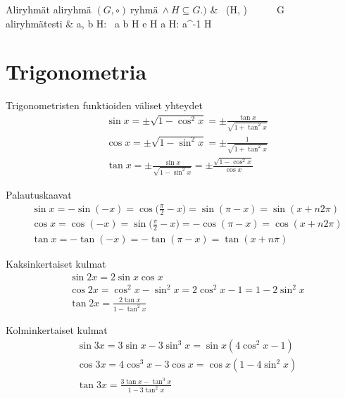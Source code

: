 \begin{eqtable-full}{Aliryhmät \cite{YHTTAY-60050}}
aliryhmä	 \newline $(G, \circ) \ \text{ryhmä} \ \land H \subseteq G.)$
				&  \ (H, \circ) \  \ \rightarrow \  \ G \  \\
aliryhmätesti	& \forall a, b \in H: \ a \circ b \in H \newline
					e \in H \newline
					\forall a \in H: a^{-1} \in H \\
\end{eqtable-full}

\clearpage

\section{Trigonometria}

Trigonometristen funktioiden väliset yhteydet \cite[s. 31]{MAOL}
\begin{align*}
& \sin x = \pm \sqrt{1- \cos^2 x} = \pm \frac{\tan x}{\sqrt{1 + \tan^2 x}} \\
& \cos x = \pm \sqrt{1 - \sin^2 x} = \pm \frac{1}{\sqrt{1 + \tan^2 x}} \\
& \tan x = \pm \frac{ \sin x}{\sqrt{1 - \sin^2 x}} = \pm \frac{\sqrt{1 - \cos^2 x}}{\cos x}
\end{align*}

Palautuskaavat \cite[s. 31]{MAOL}
\begin{align*}
& \sin x = - \sin(-x) = \cos \Big( \frac{\pi}{2} - x \Big) = \sin(\pi -x) = \sin(x + n2\pi) \\
& \cos x = \cos(-x) = \sin \Big( \frac{\pi}{2} - x \Big) = -\cos(\pi-x) = \cos(x + n2\pi) \\
& \tan x = - \tan(-x) = -\tan(\pi - x) = \tan(x + n\pi)
\end{align*}

Kaksinkertaiset kulmat \cite[s. 32]{MAOL}
\begin{align*}
& \sin 2x = 2 \sin x \cos x \\
& \cos 2x = \cos^2 x - \sin^2 x = 2 \cos^2 x - 1 = 1 - 2 \sin^2 x \\
& \tan 2x = \frac{2 \tan x}{1 - \tan^2 x}
\end{align*}

Kolminkertaiset kulmat \cite[s. 32]{MAOL}
\begin{align*}
& \sin 3x = 3 \sin x - 3 \sin^3 x = \sin x (4 \cos^2 x - 1) \\
& \cos 3x = 4 \cos^3 x - 3 \cos x = \cos x (1 - 4 \sin^2 x ) \\
& \tan 3x = \frac{3 \tan x - \tan^3 x}{1 - 3 \tan^2 x}
\end{align*}

